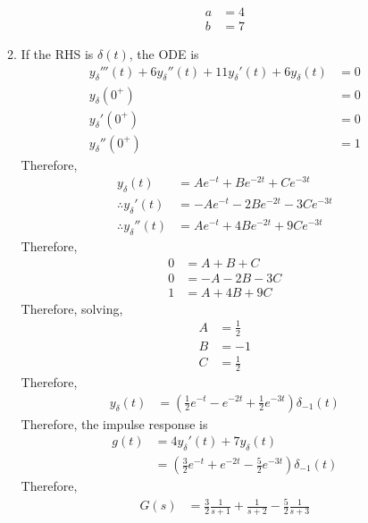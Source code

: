 \documentclass[fleqn, a4paper, 11pt, oneside]{amsart}
\theoremstyle{definition}
\theoremstyle{theorem}
\begin{document}
\begin{solution}
\begin{enumerate}[leftmargin=*]
\begin{enumerate}[leftmargin=*]
\begin{align*}
						a & = 4 \\
						b & = 7
					\end{align*}
				\item
					If the RHS is $\delta(t)$, the ODE is
					\begin{align*}
						{y_{\delta}}'''(t) + 6 {y_{\delta}}''(t) + 11 {y_{\delta}}'(t) + 6 y_{\delta}(t) & = 0 \\
						y_{\delta}(0^+)                                                                  & = 0 \\
						{y_{\delta}}'(0^+)                                                               & = 0 \\
						{y_{\delta}}''(0^+)                                                              & = 1
					\end{align*}
					Therefore,
					\begin{align*}
						y_{\delta}(t)                & = A e^{-t} + B e^{-2 t} + C e^{-3 t}      \\
						\therefore {y_{\delta}}'(t)  & = -A e^{-t} - 2 B e^{-2 t} - 3 C e^{-3 t} \\
						\therefore {y_{\delta}}''(t) & = A e^{-t} + 4 B e^{-2 t} + 9 C e^{-3 t}
					\end{align*}
					Therefore,
					\begin{align*}
						0 & = A + B + C       \\
						0 & = - A - 2 B - 3 C \\
						1 & = A + 4 B + 9 C
					\end{align*}
					Therefore, solving,
					\begin{align*}
						A & = \frac{1}{2} \\
						B & = -1          \\
						C & = \frac{1}{2}
					\end{align*}
					Therefore,
					\begin{align*}
						y_{\delta}(t) & = \left( \frac{1}{2} e^{-t} - e^{-2 t} + \frac{1}{2} e^{-3 t} \right) \delta_{-1}(t)
					\end{align*}
					Therefore, the impulse response is
					\begin{align*}
						g(t) & = 4 {y_{\delta}}'(t) + 7 y_{\delta}(t) \\
                             & = \left( \frac{3}{2} e^{-t} + e^{-2 t} - \frac{5}{2} e^{-3 t} \right) \delta_{-1}(t)
					\end{align*}
					Therefore,
					\begin{align*}
						G(s) & = \frac{3}{2} \frac{1}{s + 1} + \frac{1}{s + 2} - \frac{5}{2} \frac{1}{s + 3} \\

\end{align*}
\end{enumerate}
\end{enumerate}
\end{solution}
\end{document}
